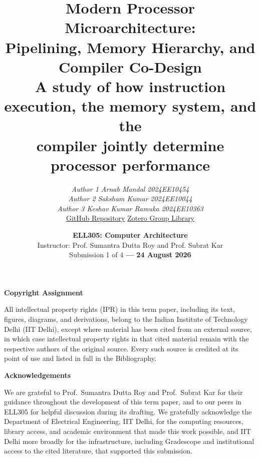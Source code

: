 \documentclass[12pt,a4paper]{report}
\title{\textbf{Modern Processor Microarchitecture:\\[4pt]
\Large Pipelining, Memory Hierarchy, and\\ Compiler Co-Design}\\[10pt]
\large A study of how instruction execution, the memory system, and the\\
compiler jointly determine processor performance}
\author{
\textit{Author 1 Arnab Mandal} \quad \textit{2024EE10454} \\
\textit{Author 2 Saksham Kumar} \quad \textit{2024EE10044} \\
\textit{Author 3 Keshav Kumar Ramuka} \quad \textit{2024EE10363} \\[8pt]
\href{https://github.com/arnabmandal-5090/Computer-Architecture-Term-Paper---Modern-Processor-Microarchitecture/new/main}{GitHub Repository}
\quad\textbar\quad
\href{https://www.zotero.org/groups/6645711/term_paper_references_67}{Zotero Group Library}
}
\date{
\textbf{ELL305: Computer Architecture}\\
Instructor: Prof. Sumantra Dutta Roy and Prof. Subrat Kar\\[6pt]
Submission 1 of 4 \textbf{--- 24 August 2026}
}
\begin{document}
\maketitle

\newpage
\thispagestyle{empty}
\vspace*{2cm}
\begin{center}
{\Large\bfseries Copyright Assignment}
\end{center}
\vspace{1.5cm}
\noindent
All intellectual property rights (IPR) in this term paper, including its
text, figures, diagrams, and derivations, belong to the Indian Institute
of Technology Delhi (IIT Delhi), except where material has been cited
from an external source, in which case intellectual property rights in
that cited material remain with the respective authors of the original
source. Every such source is credited at its point of use and listed in
full in the Bibliography.

\newpage
\thispagestyle{empty}
\vspace*{2cm}
\begin{center}
{\Large\bfseries Acknowledgements}
\end{center}
\vspace{1.5cm}
\noindent
We are grateful to Prof.\ Sumantra Dutta Roy and Prof.\ Subrat Kar for
their guidance throughout the development of this term paper, and to
our peers in ELL305 for helpful discussion during its drafting. We
gratefully acknowledge the Department of Electrical Engineering, IIT
Delhi, for the computing resources, library access, and academic
environment that made this work possible, and IIT Delhi more broadly
for the infrastructure, including Gradescope and institutional access
to the cited literature, that supported this submission.

\newpage
\end{document}
